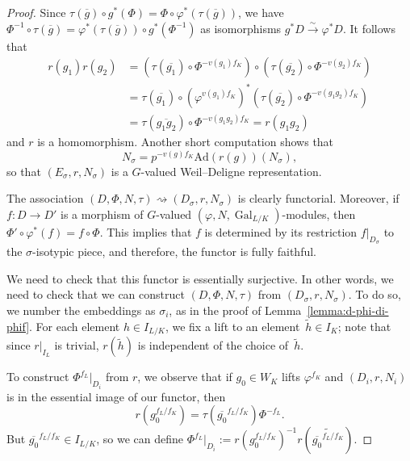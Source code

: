 \documentclass{amsart}
\def\Ad{\mathrm{Ad}}
\theoremstyle{definition}
\theoremstyle{remark}
\DeclareMathOperator{\Gal}{Gal}
\begin{document}
\begin{proof}
Since $\tau(\overline g)\circ g^\ast(\Phi)=\Phi\circ
\varphi^\ast(\tau(\overline g))$, we have $\Phi^{-1}\circ \tau(\overline g)=\varphi^\ast(\tau(\overline g))\circ g^\ast(\Phi^{-1})$ as isomorphisms $g^\ast D\xrightarrow{\sim}\varphi^\ast D$.  It follows that
\begin{align*}
r(g_1)r(g_2)&=\left(\tau(\overline {g_1})\circ \Phi^{-v(g_1)f_K}\right)\circ\left(\tau(\overline{g_2})\circ \Phi^{-v(g_2)f_K}\right)	\\
&=\tau(\overline {g_1})\circ (\varphi^{v(g_1)f_K})^\ast\left(\tau(\overline{g_2})\circ \Phi^{-v(g_1g_2)f_K}\right)	\\
&=\tau(\overline{g_1g_2})\circ \Phi^{-v(g_1g_2)f_K}=r(g_1g_2)
\end{align*}
and $r$ is a homomorphism. Another short computation shows that
\[N_\sigma=p^{-v(g)f_K}\Ad(r(g))(N_\sigma),\] so that $(E_\sigma,r,N_\sigma)$ is a $G$-valued Weil--Deligne representation.

The association $(D,\Phi,N,\tau)\rightsquigarrow (D_\sigma,r,N_\sigma)$ is clearly functorial.  Moreover, if $f:D\rightarrow D'$ is a morphism of $G$-valued $(\varphi,N,\Gal_{L/K})$-modules, then $\Phi'\circ \varphi^\ast(f)=f\circ\Phi$.  This implies that $f$ is determined by its restriction $f|_{D_\sigma}$ to the $\sigma$-isotypic piece, and therefore, the functor is fully faithful.

We need to check that this functor is essentially surjective.  In
other words, we need to check that we can construct $(D,\Phi,N,\tau)$
from $(D_\sigma,r,N_\sigma)$. To do so, we number the embeddings as
$\sigma_i$, as in the proof of Lemma~\ref{lemma:d-phi-di-phif}. For
each element $h\in I_{L/K}$, we fix a lift to an element~$\tilde{h}\in
I_K$; note that since $r|_{I_L}$ is trivial, $r(\tilde{h})$ is
independent of the choice of~$\tilde{h}$. 

To construct $\Phi^{f_L}|_{D_i}$ from $r$, we observe that if $g_0\in W_K$ lifts $\varphi^{f_K}$ and $(D_i,r,N_i)$ is in the essential image of our functor, then
\[	r(g_0^{f_L/f_K})=\tau(\overline{g_0}^{f_L/f_K})\Phi^{-f_L}.	\]
But $\overline{g_0}^{f_L/f_K}\in I_{L/K}$, so %
we can define $\Phi^{f_L}|_{D_i}:=r(g_0^{f_L/f_K})^{-1}r(\widetilde{\overline{g_0}^{f_L/f_K}})$.


\end{proof}
\end{document}
